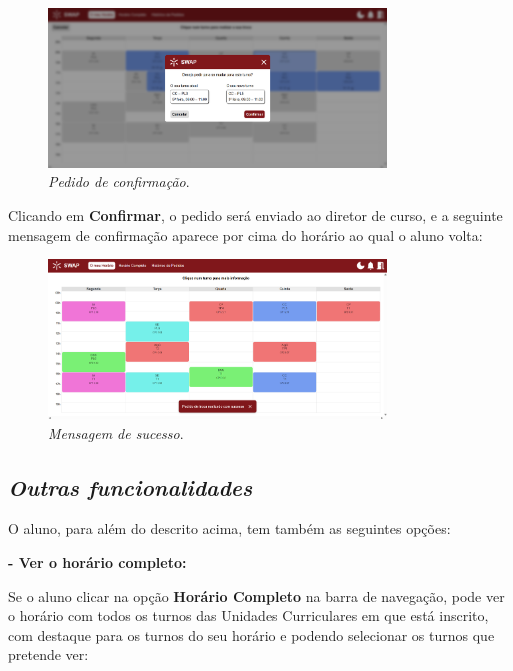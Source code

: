 \documentclass[12pt, a4paper]{article}
\begin{document}
\begin{figure}[H]
    \centering
    \includegraphics[width=0.8\textwidth]{res/manual/popup_pedir_troca.png}
    \caption{\emph{Pedido de confirmação}.}
    \label{popup_pedir_troca}
\end{figure}

Clicando em \textbf{Confirmar}, o pedido será enviado ao diretor de curso, e a seguinte
mensagem de confirmação aparece por cima do horário ao qual o aluno volta:

\begin{figure}[H]
    \centering
    \includegraphics[width=0.8\textwidth]{res/manual/toast_confirmacao_troca.png}
    \caption{\emph{Mensagem de sucesso}.}
    \label{toast_pedido_troca}
\end{figure}

\subsection{\emph{Outras funcionalidades}}

O aluno, para além do descrito acima, tem também as seguintes opções:

\textbf{- Ver o horário completo:}

Se o aluno clicar na opção  \textbf{Horário Completo} na barra de navegação,
pode ver o horário com todos os turnos das Unidades Curriculares em que está inscrito,
com destaque para os turnos do seu horário e podendo selecionar os turnos que pretende ver:
\end{document}
